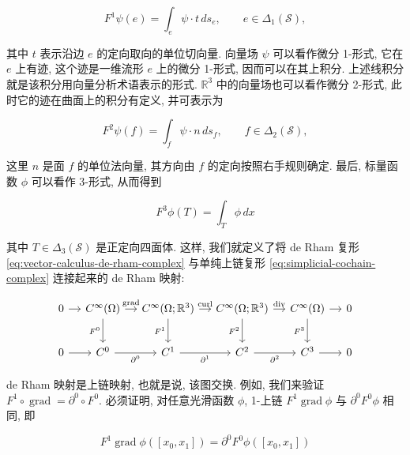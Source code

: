 \[
F^1\psi(e)=\int_e\psi\cdot t\,ds_e,\qquad e\in\Delta_1(\mathcal S),
\]

{其中 $t$ 表示沿边 $e$ 的定向取向的单位切向量. 向量场 $\psi$ 可以看作微分 1-形式, 它在 $e$ 上有迹, 这个迹是一维流形 $e$ 上的微分 1-形式, 因而可以在其上积分. 上述线积分就是该积分用向量分析术语表示的形式. $\mathbb R^3$ 中的向量场也可以看作微分 2-形式, 此时它的迹在曲面上的积分有定义, 并可表示为}

\[
F^2\psi(f)=\int_f\psi\cdot n\,ds_f,\qquad f\in\Delta_2(\mathcal S),
\]

{这里 $n$ 是面 $f$ 的单位法向量, 其方向由 $f$ 的定向按照右手规则确定. 最后, 标量函数 $\phi$ 可以看作 3-形式, 从而得到}

\[
F^3\phi(T)=\int_T\phi\,dx
\]

{其中 $T\in\Delta_3(\mathcal S)$ 是正定向四面体. 这样, 我们就定义了将 de Rham 复形 \eqref{eq:vector-calculus-de-rham-complex} 与单纯上链复形 \eqref{eq:simplicial-cochain-complex} 连接起来的 de Rham 映射:}

\begin{equation}\label{eq:de-rham-commuting-map}
\begin{tikzcd}[column sep=1.1em,row sep=2.2em]
0 \arrow[r] & C^\infty(\Omega) \arrow[r,"\operatorname{grad}"] \arrow[d,"F^0"'] & C^\infty(\Omega;\mathbb R^3) \arrow[r,"\operatorname{curl}"] \arrow[d,"F^1"'] & C^\infty(\Omega;\mathbb R^3) \arrow[r,"\operatorname{div}"] \arrow[d,"F^2"'] & C^\infty(\Omega) \arrow[r] \arrow[d,"F^3"'] & 0 \\
0 \arrow[r] & C^0 \arrow[r,"\partial^0"'] & C^1 \arrow[r,"\partial^1"'] & C^2 \arrow[r,"\partial^2"'] & C^3 \arrow[r] & 0
\end{tikzcd}
\end{equation}

{de Rham 映射是上链映射, 也就是说, 该图交换. 例如, 我们来验证 $F^1\circ\operatorname{grad}=\partial^0\circ F^0$. 必须证明, 对任意光滑函数 $\phi$, 1-上链 $F^1\operatorname{grad}\phi$ 与 $\partial^0F^0\phi$ 相同, 即}

\[
F^1\operatorname{grad}\phi([x_0,x_1])=\partial^0F^0\phi([x_0,x_1])
\]

